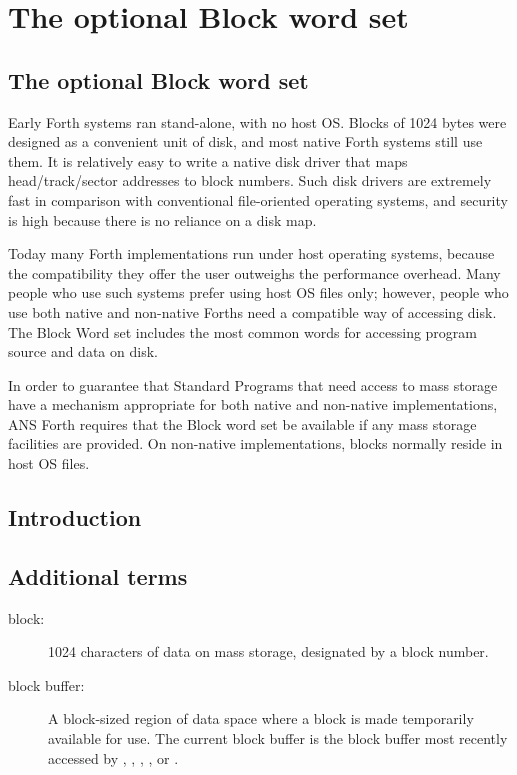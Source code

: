\chapter{The optional Block word set} %

\begin{info}
\section{The optional Block word set}

Early Forth systems ran stand-alone, with no host OS. Blocks of 1024
bytes were designed as a convenient unit of disk, and most native
Forth systems still use them. It is relatively easy to write a native
disk driver that maps head/track/sector addresses to block numbers.
Such disk drivers are extremely fast in comparison with conventional
file-oriented operating systems, and security is high because there is
no reliance on a disk map.

Today many Forth implementations run under host operating systems,
because the compatibility they offer the user outweighs the performance
overhead. Many people who use such systems prefer using host OS files
only; however, people who use both native and non-native Forths need a
compatible way of accessing disk. The Block Word set includes the most
common words for accessing program source and data on disk.

In order to guarantee that Standard Programs that need access to mass
storage have a mechanism appropriate for both native and non-native
implementations, ANS Forth requires that the Block word set be
available if any mass storage facilities are provided. On non-native
implementations, blocks normally reside in host OS files.

\end{info}


\section{Introduction} %

\section{Additional terms} %

\begin{description}
\item[block:]
	1024 characters of data on mass storage,
	designated by a block number.

\item[block buffer:]
	A block-sized region of data space where a block is made
	temporarily available for use. The current block buffer
	is the block buffer most recently accessed by
	, , , , or
	.
\end{description}

